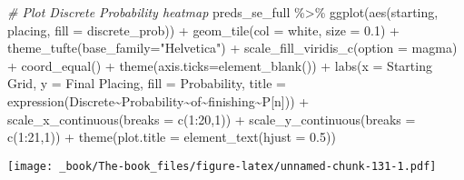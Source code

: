 \documentclass[
]{book}
\newenvironment{Shaded}{\begin{snugshade}}{\end{snugshade}}
\newcommand{\AttributeTok}[1]{\textcolor[rgb]{0.77,0.63,0.00}{#1}}
\newcommand{\CommentTok}[1]{\textcolor[rgb]{0.56,0.35,0.01}{\textit{#1}}}
\newcommand{\DecValTok}[1]{\textcolor[rgb]{0.00,0.00,0.81}{#1}}
\newcommand{\FloatTok}[1]{\textcolor[rgb]{0.00,0.00,0.81}{#1}}
\newcommand{\FunctionTok}[1]{\textcolor[rgb]{0.00,0.00,0.00}{#1}}
\newcommand{\NormalTok}[1]{#1}
\newcommand{\SpecialCharTok}[1]{\textcolor[rgb]{0.00,0.00,0.00}{#1}}
\newcommand{\StringTok}[1]{\textcolor[rgb]{0.31,0.60,0.02}{#1}}
\begin{document}
\begin{Shaded}
\begin{Highlighting}[]
\CommentTok{\# Plot Discrete Probability heatmap}
\NormalTok{preds\_se\_full }\SpecialCharTok{\%\textgreater{}\%}
  \FunctionTok{ggplot}\NormalTok{(}\FunctionTok{aes}\NormalTok{(starting, placing, }\AttributeTok{fill =}\NormalTok{ discrete\_prob)) }\SpecialCharTok{+}
  \FunctionTok{geom\_tile}\NormalTok{(}\AttributeTok{col =} \StringTok{\textquotesingle{}white\textquotesingle{}}\NormalTok{, }\AttributeTok{size =} \FloatTok{0.1}\NormalTok{) }\SpecialCharTok{+}
  \FunctionTok{theme\_tufte}\NormalTok{(}\AttributeTok{base\_family=}\StringTok{"Helvetica"}\NormalTok{) }\SpecialCharTok{+}
  \FunctionTok{scale\_fill\_viridis\_c}\NormalTok{(}\AttributeTok{option =} \StringTok{\textquotesingle{}magma\textquotesingle{}}\NormalTok{) }\SpecialCharTok{+}
  \FunctionTok{coord\_equal}\NormalTok{() }\SpecialCharTok{+}
  \FunctionTok{theme}\NormalTok{(}\AttributeTok{axis.ticks=}\FunctionTok{element\_blank}\NormalTok{()) }\SpecialCharTok{+}
  \FunctionTok{labs}\NormalTok{(}\AttributeTok{x =} \StringTok{\textquotesingle{}Starting Grid\textquotesingle{}}\NormalTok{,}
       \AttributeTok{y =} \StringTok{\textquotesingle{}Final Placing\textquotesingle{}}\NormalTok{,}
       \AttributeTok{fill =} \StringTok{\textquotesingle{}Probability\textquotesingle{}}\NormalTok{,}
       \AttributeTok{title =} \FunctionTok{expression}\NormalTok{(Discrete}\SpecialCharTok{\textasciitilde{}}\NormalTok{Probability}\SpecialCharTok{\textasciitilde{}}\NormalTok{of}\SpecialCharTok{\textasciitilde{}}\NormalTok{finishing}\SpecialCharTok{\textasciitilde{}}\NormalTok{P[n])) }\SpecialCharTok{+}
  \FunctionTok{scale\_x\_continuous}\NormalTok{(}\AttributeTok{breaks =} \FunctionTok{c}\NormalTok{(}\DecValTok{1}\SpecialCharTok{:}\DecValTok{20}\NormalTok{,}\DecValTok{1}\NormalTok{)) }\SpecialCharTok{+}
  \FunctionTok{scale\_y\_continuous}\NormalTok{(}\AttributeTok{breaks =} \FunctionTok{c}\NormalTok{(}\DecValTok{1}\SpecialCharTok{:}\DecValTok{21}\NormalTok{,}\DecValTok{1}\NormalTok{)) }\SpecialCharTok{+}
  \FunctionTok{theme}\NormalTok{(}\AttributeTok{plot.title =} \FunctionTok{element\_text}\NormalTok{(}\AttributeTok{hjust =} \FloatTok{0.5}\NormalTok{))}
\end{Highlighting}
\end{Shaded}

\texttt{[image: \_book/The-book\_files/figure-latex/unnamed-chunk-131-1.pdf]}
\end{document}
